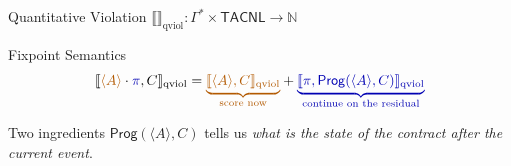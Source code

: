 \documentclass[9pt,aspectratio=169]{beamer}
\newcommand{\logic}[1]{\ensuremath{\mathsf{#1}}\xspace}
\newcommand{\cDL}{\logic{TACNL}}
\newcommand{\Prog}{\ensuremath{\mathsf{Prog}}\xspace}
\newcommand{\repair}{\ensuremath{\blacktriangleright}}
\newcommand{\obl}[2][]{\mathbf{O}_{#1}(#2)}
\newcommand{\trace}[1]{\ensuremath{\langle #1 \rangle}\xspace}
\newcommand{\qsem}[1]{\llbracket #1 \rrbracket_{\text{qviol}}}
\newcommand{\LH}{\ensuremath{\mathsf{LH}}}
\newcommand{\PAY}{\ensuremath{\mathsf{PAY\_R}}\xspace}
\newcommand{\PAYF}{\ensuremath{\mathsf{PAY\_F}}\xspace}
\newcommand{\OCC}{\ensuremath{\mathsf{OCC}}\xspace}
\begin{document}
\begin{frame}{Quantitative Violation $\qsem{}:\Gamma^* \times \cDL \to \mathbb{N}$}



  \begin{block}{Fixpoint Semantics}
 {\Large
\[
    \qsem{\textcolor{orange!70!black}{\trace{A}}\cdot \textcolor{blue!70!black}{\pi}, C}
    =
    \textcolor{orange!70!black}{\underbrace{\qsem{\textcolor{orange!70!black}{\trace{A}},C}}_{\text{score now}}}
    +
    \textcolor{blue!70!black}{\underbrace{\qsem{\textcolor{blue!70!black}{\pi},\Prog(\trace{A},C)}}_{\text{continue on the residual}}}
\]
}

  \end{block}
    \begin{block}{Two ingredients}
    $\Prog(\trace{A},C)$ tells us \emph{what is the state of the contract after the current event}.
  \end{block}

  
\end{frame}
\end{document}
